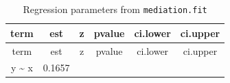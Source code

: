 \documentclass[]{article}
\theoremstyle{definition}
\theoremstyle{definition}
\theoremstyle{definition}
\theoremstyle{remark}
\begin{document}
\begin{longtable}[]{@{}cccccc@{}}
\caption{Regression parameters from
\texttt{mediation.fit}}\tabularnewline
\toprule
\begin{minipage}[b]{0.09\columnwidth}\centering\strut
term\strut
\end{minipage} & \begin{minipage}[b]{0.10\columnwidth}\centering\strut
est\strut
\end{minipage} & \begin{minipage}[b]{0.09\columnwidth}\centering\strut
z\strut
\end{minipage} & \begin{minipage}[b]{0.14\columnwidth}\centering\strut
pvalue\strut
\end{minipage} & \begin{minipage}[b]{0.13\columnwidth}\centering\strut
ci.lower\strut
\end{minipage} & \begin{minipage}[b]{0.13\columnwidth}\centering\strut
ci.upper\strut
\end{minipage}\tabularnewline
\midrule
\endfirsthead
\toprule
\begin{minipage}[b]{0.09\columnwidth}\centering\strut
term\strut
\end{minipage} & \begin{minipage}[b]{0.10\columnwidth}\centering\strut
est\strut
\end{minipage} & \begin{minipage}[b]{0.09\columnwidth}\centering\strut
z\strut
\end{minipage} & \begin{minipage}[b]{0.14\columnwidth}\centering\strut
pvalue\strut
\end{minipage} & \begin{minipage}[b]{0.13\columnwidth}\centering\strut
ci.lower\strut
\end{minipage} & \begin{minipage}[b]{0.13\columnwidth}\centering\strut
ci.upper\strut
\end{minipage}\tabularnewline
\midrule
\endhead
\begin{minipage}[t]{0.09\columnwidth}\centering\strut
y \textasciitilde{} x\strut
\end{minipage} & \begin{minipage}[t]{0.10\columnwidth}\centering\strut
0.1657\strut
\end{minipage} & \begin{minipage}[t]{0.09\columnwidth}\centering\strut

\end{minipage}
\end{longtable}
\end{document}
